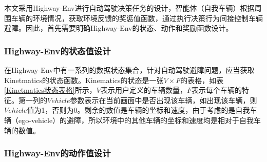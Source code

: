 本文采用Highway-Env进行自动驾驶决策任务的设计，智能体（自我车辆）根据周围车辆的环境情况，获取环境反馈的奖惩值函数，通过执行决策行为间接控制车辆避障。因此，首先需要明确Highway-Env的状态、动作和奖励函数设计。

\subsubsection{Highway-Env的状态值设计}

在Highway-Env中有一系列的数据状态集合，针对自动驾驶避障问题，应当获取Kinetmatics的状态函数。Kinematics的状态是一张$V \times F$的表格，如表\ref{Kinetmatics状态表格}所示，$V$表示用户定义的车辆数量，$F$表示每个车辆的特征。第一列的$Vehicle$参数表示在当前画面中是否出现该车辆，如出现该车辆，则$Vehicle$值为1，否则为0。剩余的数值是车辆的坐标和速度，由于考虑的是自我车辆（ego-vehicle）的避障，所以环境中的其他车辆的坐标和速度均是相对于自我车辆的数值。

\begin{table}[htbp]
    \caption{Kinetmatics状态表格}\label{Kinetmatics状态表格}
    \centering
    \renewcommand\arraystretch{1.5}
\end{table}

\subsubsection{Highway-Env的动作值设计}


